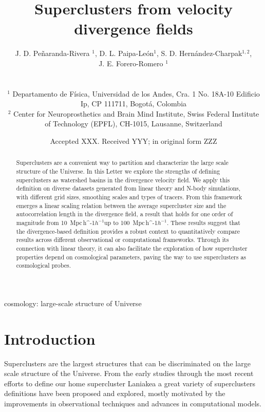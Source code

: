 \documentclass[usenatbib]{mnras}
\title[Superclusters from velocity divergence fields]{Superclusters from velocity divergence fields}
\author[Pe\~naranda-Rivera et al.]{
\parbox[t]{\textwidth}{
    {J. D. Pe\~naranda-Rivera $^1$,} 
    {D. L. Paipa-Le\'on$^{1}$,}
    {S. D. Hern\'andez-Charpak$^{1,2}$,}\\
    {J. E. Forero-Romero $^{1}$}
}
\\\\
$^{1}$ Departamento de F\'isica, Universidad de los Andes, Cra. 1
  No. 18A-10 Edificio Ip, CP 111711, Bogot\'a, Colombia \\
$^{2}$ Center for Neuroprosthetics and Brain Mind Institute, Swiss
  Federal Institute of Technology (EPFL), CH-1015, Lausanne,
  Switzerland\\  
}
\date{Accepted XXX. Received YYY; in original form ZZZ}
\newcommand{\Mpch}{\,{\rm Mpc}\,\ifmmode h^{-1}\else $h^{-1}$\fi}
\begin{document}
\label{firstpage}
\pagerange{\pageref{firstpage}--\pageref{lastpage}}
\maketitle

\maketitle
\begin{abstract}
Superclusters are a convenient way to partition and characterize the large scale structure of the Universe.
In this Letter we explore the strengths of defining superclusters as watershed basins in the divergence velocity field.
We apply this definition on diverse datasets generated from linear theory and  N-body simulations, with different grid sizes, smoothing scales and types of tracers.
From this framework emerges a linear scaling relation between the average supercluster size and the autocorrelation length in the divergence field, a result that holds for one order of magnitude from 10 \Mpch up to 100 \Mpch.
These results suggest that the divergence-based definition provides a robust context to quantitatively compare results across different observational or computational frameworks. 
Through its connection with linear theory, it can also facilitate the exploration of how supercluster properties depend on cosmological parameters, 
paving the way to use superclusters as cosmological probes.
\end{abstract}

\begin{keywords}
cosmology: large-scale structure of Universe
\end{keywords}




\section{Introduction}

Superclusters are the largest structures that can be discriminated on the large scale structure of the Universe. 
From the early studies \citep{1983ARA&A..21..373O} through the most recent efforts to define our home supercluster Laniakea \citep{2014Natur.513...71T} a great variety of superclusters definitions have been proposed and explored, mostly motivated by the improvements in observational techniques and advances in computational models. 
\end{document}
